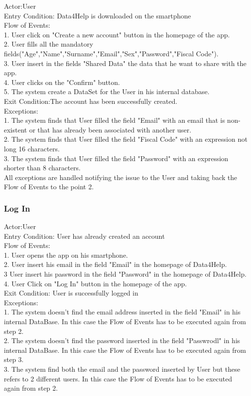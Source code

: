 Actor:User\\
Entry Condition: Data4Help is downloaded on the smartphone\\
Flow of Events:\\
1. User click on "Create a new account" button in the homepage of the app.\\
2. User fills all the mandatory fields("Age","Name","Surname","Email","Sex","Password","Fiscal Code").\\
3. User insert in the fields "Shared Data" the data that he want to share with the app.\\
4. User clicks on the "Confirm" button.\\
5. The system create a DataSet for the User in his internal database.\\
Exit Condition:The account has been successfully created.\\
Exceptions:\\
1. The system finds that User filled the field "Email"  with an email that is non-existent or that has already been associated with another user.\\
2. The system finds that User filled the field "Fiscal Code" with an expression not long 16 characters.\\
3. The system finds that User filled the field "Password" with an expression shorter than 8 characters.\\
All exceptions are handled notifying the issue to the User and taking back the Flow of Events to the point 2.\\


\subsubsection{Log In}
Actor:User\\
Entry Condition: User has already created an account\\
Flow of Events:\\
1. User opens the app on his smartphone.\\
2. User insert his email in the field "Email" in the homepage of Data4Help.\\
3  User insert his password in the field "Password" in the homepage of Data4Help.\\
4. User Click on "Log In" button in the homepage of the app.\\
Exit Condition: User is successfully logged in\\
Exceptions:\\
1. The system doesn't find the email address inserted in the field "Email" in his internal DataBase. In this case the Flow of Events has to be executed again from step 2. \\
2. The system doesn't find the password inserted in the field "Passwrodl" in his internal DataBase. In this case the Flow of Events has to be executed again from step 3. \\
3. The system find both the email and the password inserted by User but these refers to 2 different users. In this case the Flow of Events has to be executed again from step 2. \\

